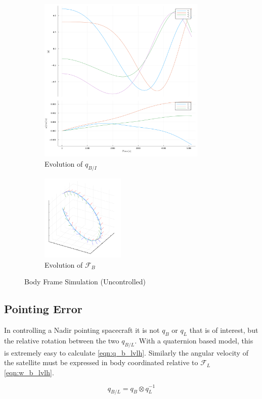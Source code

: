 \documentclass{article}
\begin{document}
\begin{figure}[H]
\centering
	\begin{subfigure}[b]{0.6\textwidth}
		\centering
		\includegraphics[width=8cm]{images/dist_attitude.png}
		\caption{Evolution of $q_{B/I}$}
		\label{fig:quat_dist}
	\end{subfigure}
	\begin{subfigure}[b]{0.3\textwidth}
		\centering
		\includegraphics[width=4cm]{images/dist_orbit_0s_to_5100s.png}
		\caption{Evolution of $\mathcal{F}_{B}$}
		\label{fig:orbit_dist}
	\end{subfigure}
	\caption{Body Frame Simulation (Uncontrolled)}
\end{figure}

\subsection{Pointing Error}

In controlling a Nadir pointing spacecraft it is not $q_B$ or $q_L$ that is of interest, but the relative rotation between the two $q_{B/L}$. With a quaternion based model, this is extremely easy to calculate \ref{eqn:q_b_lvlh}. Similarly the angular velocity of the satellite must be expressed in body coordinated relative to $\mathcal{F}_L$ \ref{eqn:w_b_lvlh}.

\begin{equation}
	q_{B/L} = q_B \otimes q_L^{-1}
	\label{eqn:q_b_lvlh}
\end{equation}
\end{document}
